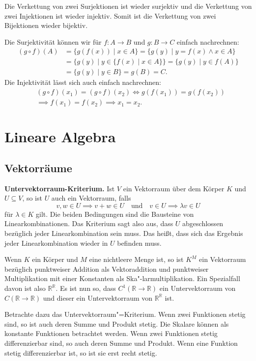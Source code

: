 \documentclass[a4paper,11pt,fleqn,twoside]{scrartcl}
\numberwithin{equation}{section}
\newcommand{\R}{\mathbb R}
\newcommand{\strong}[1]{{\normalfont\sffamily\bfseries #1}}
\theoremstyle{rmbox}
\begin{document}
Die Verkettung von zwei Surjektionen ist wieder surjektiv
und die Verkettung von zwei Injektionen ist wieder injektiv. Somit
ist die Verkettung von zwei Bijektionen wieder bijektiv.

Die Surjektivität können wir für $f\colon A\to B$ und $g\colon B\to C$
einfach nachrechnen:
\begin{align}
(g\circ f)(A) &= \{g(f(x))\mid x\in A\} = \{g(y)\mid y=f(x)\wedge x\in A\}\\
&= \{g(y)\mid y\in\{f(x)\mid x\in A\}\} = \{g(y)\mid y\in f(A)\}\\
&= \{g(y)\mid y\in B\} = g(B) = C.
\end{align}
Die Injektivität lässt sich auch einfach nachrechnen:
\begin{align}
&(g\circ f)(x_1) = (g\circ f)(x_2)
\iff g(f(x_1)) = g(f(x_2))\\
& \implies f(x_1) = f(x_2)
\implies x_1=x_2.
\end{align}

\section{Lineare Algebra}
\subsection{Vektorräume}
\strong{Untervektorraum-Kriterium.}
Ist $V$ ein Vektorraum über
dem Körper $K$ und $U\subseteq V$, so ist $U$ auch ein Vektorraum,
falls
\begin{equation}
v,w\in U\implies v+w\in U
\quad\text{und}\quad
v\in U\implies \lambda v\in U
\end{equation}
für $\lambda\in K$ gilt. Die beiden Bedingungen sind die Bausteine von
Linearkombinationen. Das Kriterium sagt also aus, dass $U$
abgeschlossen bezüglich jeder Linearkombination sein muss.
Das heißt, dass sich das Ergebnis jeder Linearkombination wieder
in $U$ befinden muss.

Wenn $K$ ein Körper und
$M$ eine nichtleere Menge ist, so ist $K^M$ ein Vektorraum bezüglich
punktweiser Addition als Vektoraddition und punktweiser Multiplikation
mit einer Konstanten als Ska"-larmultiplikation. Ein Spezialfall davon
ist also $\R^\R$. Es ist nun so, dass $C^1(\R\to\R)$ ein Untervektorraum
von $C(\R\to\R)$ und dieser ein Untervektorraum von $\R^\R$ ist.

Betrachte dazu das Untervektorraum"=Kriterium. Wenn zwei Funktionen
stetig sind, so ist auch deren Summe und Produkt stetig. Die Skalare
können als konstante Funktionen betrachtet werden. Wenn zwei
Funktionen stetig differenzierbar sind, so auch deren Summe und
Produkt. Wenn eine Funktion stetig differenzierbar ist, so ist sie
erst recht stetig.
\end{document}
